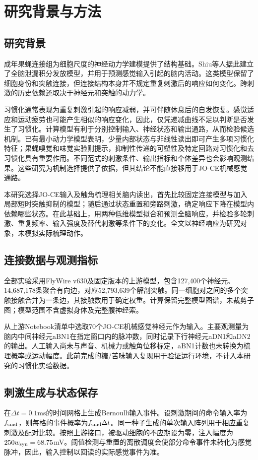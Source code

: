 \section{研究背景与方法}
\label{sec:questions}
\subsection{研究背景}
成年果蝇连接组为细胞尺度的神经动力学建模提供了结构基础\citep{dorkenwald2024}。Shiu等人据此建立了全脑泄漏积分发放模型，并用于预测感觉输入引起的脑内活动\citep{shiu2024}。这类模型保留了细胞身份和突触连接，但连接结构本身并不规定重复刺激后的响应如何变化。跨刺激的历史依赖还取决于神经元和突触的动力学。

习惯化通常表现为重复刺激引起的响应减弱，并可伴随休息后的自发恢复。感觉适应和运动疲劳也可能产生相似的响应变化，因此，仅凭递减曲线不足以判断是否发生了习惯化\citep{rankin2009}。计算模型有利于分别控制输入、神经状态和输出通路，从而检验候选机制。已有最小动力学模型表明，少量内部状态与非线性读出即可产生多项习惯化特征\citep{smart2024}；果蝇嗅觉和味觉实验则提示，抑制性传递的可塑性及特定回路对习惯化和去习惯化具有重要作用\citep{das2011,paranjpe2012,trisal2022}。不同范式的刺激条件、输出指标和个体差异也会影响观测结果\citep{engel2009,boon2026}。这些研究为机制选择提供了依据，但其结论不能直接移用于JO-CE机械感觉通路。

本研究选择JO-CE输入及触角梳理相关脑内读出，首先比较固定连接模型与加入局部短时突触抑制的模型；随后通过状态重置和旁路刺激，确定响应下降在模型内依赖哪些状态。在此基础上，用两种低维模型拟合和预测全脑响应，并检验多轮刺激、重复频率、输入强度及替代刺激等条件下的变化。全文以神经响应为研究对象，未模拟实际梳理动作。

\subsection{连接数据与观测指标}
全部实验采用FlyWire v630及固定版本的上游模型，包含127,400个神经元、14,687,178条聚合有向边，对应52,793,639个解剖突触。同一细胞对之间的多个突触接触合并为一条边，其接触数用于确定权重。计算保留完整模型图谱，未裁剪子图；模型范围不含虚拟身体及完整腹神经索。

从上游Notebook清单中选取70个JO-CE机械感觉神经元作为输入。主要观测量为脑内中间神经元aBN1在指定窗口内的脉冲数，同时记录下行神经元aDN1和aDN2的输出。人工输入尚未与声音、机械力或触角位移标定，aBN1计数也未转换为梳理概率或运动幅度。此前完成的糖/苦味输入复现用于验证运行环境，不计入本研究的习惯化实验数据。

\subsection{刺激生成与状态保存}
在$\Delta t=0.1$ms的时间网格上生成Bernoulli输入事件。设刺激期间的命令输入率为$f_{\rm cmd}$，则每格的事件概率为$f_{\rm cmd}\Delta t$。同一种子生成的单次输入阵列用于相应重复刺激及配对比较。按照上游接口，被驱动细胞的不应期设为零，注入幅度为$250w_{\rm syn}=68.75$mV。阈值检测与重置的离散调度会使部分命令事件未转化为感觉脉冲，因此，输入控制以回读的实际感觉事件为准。

